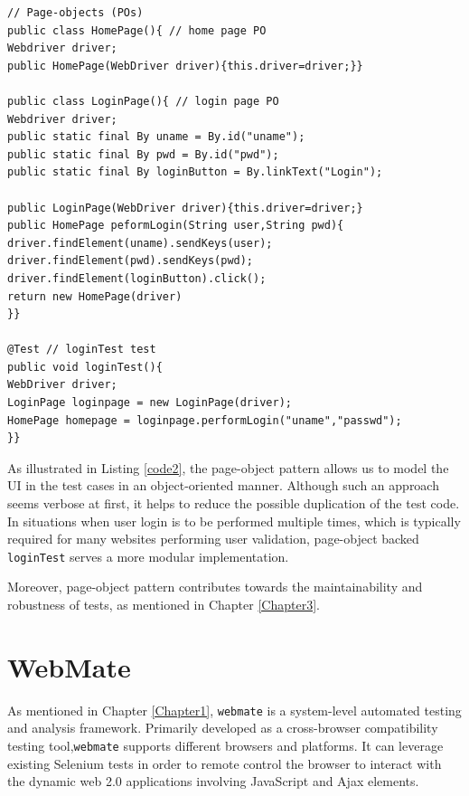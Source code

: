 \begin{center}
\begin{scriptsize}
\centering
\lstset{
  basicstyle=\ttfamily,
  columns=fullflexible,
  keepspaces=true,
}
  
\begin{lstlisting}[caption=Page-Objects design for \texttt{loginTest},label=code2]
// Page-objects (POs)
public class HomePage(){ // home page PO
Webdriver driver;
public HomePage(WebDriver driver){this.driver=driver;}}

public class LoginPage(){ // login page PO
Webdriver driver;
public static final By uname = By.id("uname");
public static final By pwd = By.id("pwd");
public static final By loginButton = By.linkText("Login");

public LoginPage(WebDriver driver){this.driver=driver;}
public HomePage peformLogin(String user,String pwd){
driver.findElement(uname).sendKeys(user);
driver.findElement(pwd).sendKeys(pwd);
driver.findElement(loginButton).click();
return new HomePage(driver)
}}

@Test // loginTest test
public void loginTest(){
WebDriver driver;
LoginPage loginpage = new LoginPage(driver);
HomePage homepage = loginpage.performLogin("uname","passwd");
}}
\end{lstlisting}
\end{scriptsize} 
\end{center}
 
As illustrated in Listing \ref{code2}, the page-object pattern allows us to model the UI in the test cases in an object-oriented manner. Although such an approach seems verbose at first, it helps to reduce the possible duplication of the test code. In situations when user login is to be performed multiple times, which is typically required for many websites performing user validation, page-object backed \texttt{loginTest} serves a more modular implementation. 

Moreover, page-object pattern contributes towards the maintainability and robustness of tests\cite{leottaPObs}, as mentioned in Chapter \ref{Chapter3}.


\section{WebMate}
\label{sec:WebMate}
As mentioned in Chapter \ref{Chapter1}, \texttt{webmate}\cite{webmate} is a system-level automated testing and analysis framework. Primarily developed as a cross-browser compatibility testing tool,\texttt{webmate} supports different browsers and platforms. It can leverage existing Selenium tests in order to remote control the browser to interact with the dynamic web 2.0 applications involving JavaScript and Ajax elements. 

